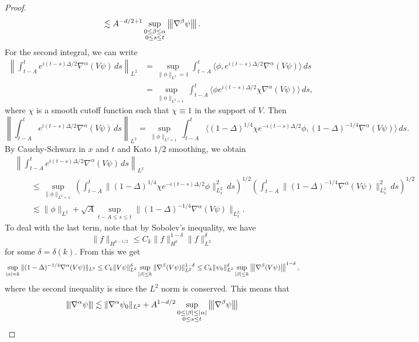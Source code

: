 \begin{proof}
\[    \lesssim A^{-d / 2 + 1} \sup_{\substack{0 \le \beta \le \alpha \\ 0 \le s \le t}} \left\lvert\hspace{-1 pt}\left\lvert\hspace{-1 pt}\left\lvert {\nabla^{\beta} \psi}\right\lvert\hspace{-1 pt}\right\lvert\hspace{-1 pt}\right\lvert.
  \]
  For the second integral, we can write
  \begin{align*}
    \left\| \int_{t - A}^t e^{i(t - s) \Delta / 2} \nabla^\alpha (V \psi)\, ds \right\|_{L^2}
    &= \sup_{\|\phi\|_{L^2} = 1} \int_{t - A}^t \langle \phi, e^{i(t - s) \Delta / 2} \nabla^\alpha (V \psi) \rangle\, ds \\
    &= \sup_{\|\phi\|_{L^2 = 1}} \int_{t - A}^t
    \langle \phi e^{i(t - s) \Delta / 2} \chi \nabla^\alpha (V \psi) \rangle\, ds,
  \end{align*}
  where $\chi$ is a smooth cutoff function such that
  $\chi \equiv 1$ in the support of $V$. Then
  \[
    \left\| \int_{t - A}^t e^{i(t - s) \Delta / 2} \nabla^\alpha (V \psi)\, ds \right\|_{L^2}
    = \sup_{\|\phi\|_{L^2 = 1}}
    \int_{t - A}^t \langle (1 - \Delta)^{1 / 4} \chi e^{-i(t - s)\Delta / 2} \phi, (1 - \Delta)^{-1 / 4} \nabla^{\alpha} (V \psi) \rangle\, ds.
  \]
  By Cauchy-Schwarz in $x$ and $t$ and Kato
  $1 / 2$ smoothing, we obtain
  \begin{align*}
    &\left\| \int_{t - A}^t e^{i(t - s) \Delta / 2} \nabla^\alpha (V \psi)\, ds \right\|_{L^2} \\
    & \quad \quad \le \sup_{\|\phi\|_{L^2 = 1}}
    \left(\int_{t - A}^t \|(1 - \Delta)^{1 / 4} \chi e^{-i(t - s) \Delta / 2} \phi\|_{L^2_x}^2 \, ds\right)^{1 / 2} 
    \left(\int_{t - A}^t \|(1 - \Delta)^{-1 / 4} \nabla^\alpha(V\psi)\|_{L^2_x}^2 \, ds\right)^{1 / 2} \\
    & \quad \quad \lesssim \|\phi\|_{L^2}
    + \sqrt{A} \sup_{t - A \le s \le t} \|(1 - \Delta)^{-1 / 4} \nabla^\alpha(V\psi)\|_{L^2_x}.
  \end{align*}
  To deal with the last term, note that by Sobolev's
  inequality, we have
  \[
    \|f\|_{H^{k - 1 / 2}} \le C_k \|f\|_{H^k}^{1 - \delta} \|f\|_{L^2}^{\delta}
  \]
  for some $\delta = \delta(k)$. From this we get
  \[
    \sup_{|\alpha| = k}
    \|(1 - \Delta)^{-1 / 4} \nabla^\alpha(V\psi)\|_{L^2}
    \le C_k \|V\psi\|_{L^2}^\delta \sup_{|\beta| \le k} \|\nabla^\beta (V\psi)\|_{L^2}^{1 - \delta}
    \le C_k \|\psi_0\|_{L^2}^\delta \sup_{|\beta| \le k} \left\lvert\hspace{-1 pt}\left\lvert\hspace{-1 pt}\left\lvert {\nabla^\beta (V\psi)}\right\lvert\hspace{-1 pt}\right\lvert\hspace{-1 pt}\right\lvert^{1 - \delta},
  \]
  where the second inequality is since the $L^2$
  norm is conserved. This means that
  \[
    \left\lvert\hspace{-1 pt}\left\lvert\hspace{-1 pt}\left\lvert {\nabla^\alpha \psi}\right\lvert\hspace{-1 pt}\right\lvert\hspace{-1 pt}\right\lvert
    \lesssim \|\nabla^\alpha \psi_0\|_{L^2}
    + A^{1 - d / 2} \sup_{\substack{0 \le |\beta| \le |\alpha| \\ 0 \le s \le t}} \left\lvert\hspace{-1 pt}\left\lvert\hspace{-1 pt}\left\lvert {\nabla^\beta \psi}\right\lvert\hspace{-1 pt}\right\lvert\hspace{-1 pt}\right\lvert
\]
\end{proof}
